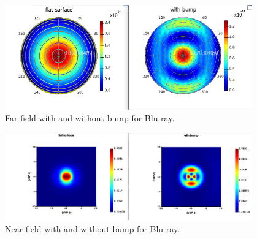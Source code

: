 \documentclass[11pt,a4paper]{article}
\begin{document}
\begin{figure}
        \includegraphics[width=0.95\textwidth]{smaller_farfield.png}
        \caption{Far-field with and without bump for Blu-ray.}
\end{figure}
\begin{figure}
        \includegraphics[width=0.95\textwidth]{smaller_nearfield.png}
        \caption{Near-field with and without bump for Blu-ray.}
\end{figure}
\end{document}
